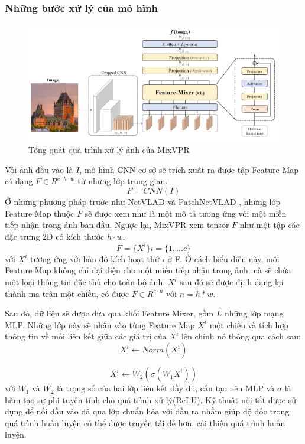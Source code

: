 \subsubsection*{Những bước xử lý của mô hình}
\begin{figure}[H]
    \centering
    \includegraphics[scale=0.7]{pics/Proposal/mixvpr.png}
    \caption{Tổng quát quá trình xử lý ảnh của MixVPR \cite{alibey2023mixvpr}}
\end{figure}
Với ảnh đầu vào là $I$, mô hình CNN cơ sở sẽ trích xuất ra được tập Feature Map có dạng $F \in R^{c \cdot h \cdot w}$ từ những lớp trung gian.
$$
F = CNN(I)
$$
Ở những phương pháp trước như NetVLAD \cite{arandjelović2016netvlad} và PatchNetVLAD \cite{hausler2021patchnetvlad}, những lớp Feature Map thuộc $F$ sẽ được xem như là một mô tả tương ứng với một miền tiếp nhận trong ảnh ban đầu. Ngược lại, MixVPR xem tensor $F$ như một tập các đặc trưng 2D có kích thước $h \cdot w$.
$$
F = \{X^{i}\}    i = \{1,...c\}
$$
với $X^{i}$ tương ứng với bản đồ kích hoạt thứ $i$ ở F. Ở cách biểu diễn này, mỗi Feature Map không chỉ đại diện cho một miền tiếp nhận trong ảnh mà sẽ chứa một loại thông tin đặc thù cho toàn bộ ảnh. $X^{i}$ sau đó sẽ được định dạng lại thành ma trận một chiều, có được $F \in R^{c \cdot n}$ với $n = h*w$.

Sau đó, dữ liệu sẽ được đưa qua khối Feature Mixer, gồm $L$ những lớp mạng MLP. Những lớp này sẽ nhận vào từng Feature Map $X^{i}$ một chiều và tích hợp thông tin về mối liên kết giữa các giá trị của $X^{i}$ lên chính nó thông qua cách sau:
$$
X^{i} \leftarrow Norm(X^{i})
$$

$$
X^{i} \leftarrow W_2(\sigma(W_1 X^{i}))
$$
với $W_1$ và $W_2$ là trọng số của hai lớp liên kết đầy đủ, cấu tạo nên MLP và $\sigma$ là hàm tạo sự phi tuyến tính cho quá trình xử lý(ReLU). Kỹ thuật nối tắt được sử dụng để nối đầu vào đã qua lớp chuẩn hóa với đầu ra nhằm giúp độ dốc trong quá trình huấn luyện có thể được truyền tải dễ hơn, cải thiện quá trình huấn luyện.

